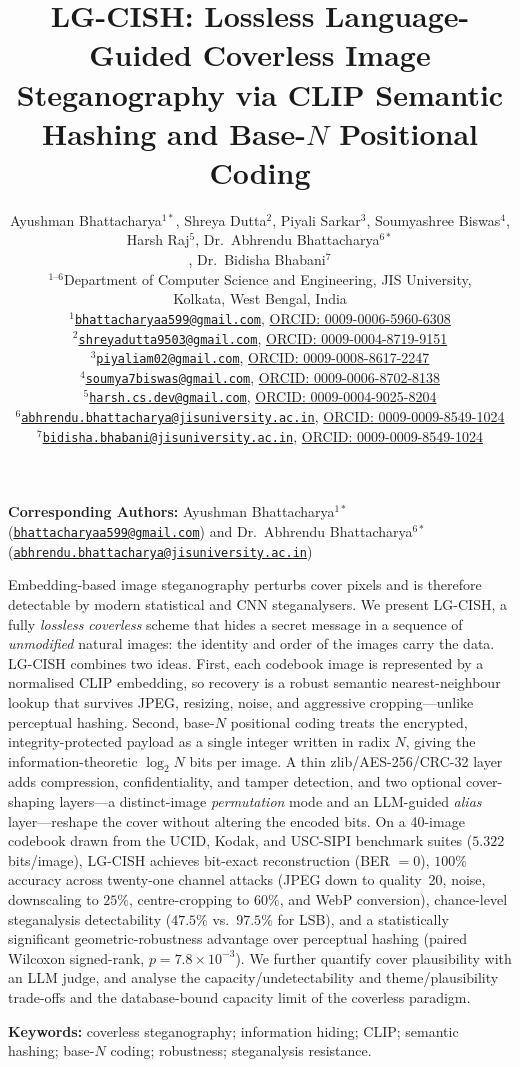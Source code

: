 \documentclass[11pt]{article}
\title{\textbf{LG-CISH: Lossless Language-Guided Coverless Image\\
Steganography via CLIP Semantic Hashing and Base-$N$ Positional Coding}}
\author{%
\begin{minipage}{0.95\textwidth}
\centering
Ayushman Bhattacharya$^{1*}$, Shreya Dutta$^{2}$,
Piyali Sarkar$^{3}$, Soumyashree Biswas$^{4}$,\\
Harsh Raj$^{5}$, Dr.\ Abhrendu Bhattacharya$^{6*}$\\[0.5em], Dr.\  Bidisha Bhabani$^{7}$\\[0.5em]
{\small $^{1\text{--}6}$Department of Computer Science and Engineering, JIS University,\\
Kolkata, West Bengal, India}\\[0.5em]
{\scriptsize
$^{1}$\href{mailto:bhattacharyaa599@gmail.com}{\texttt{bhattacharyaa599@gmail.com}},
\href{https://orcid.org/0009-0006-5960-6308}{ORCID: 0009-0006-5960-6308}\\
$^{2}$\href{mailto:shreyadutta9503@gmail.com}{\texttt{shreyadutta9503@gmail.com}},
\href{https://orcid.org/0009-0004-8719-9151}{ORCID: 0009-0004-8719-9151}\\
$^{3}$\href{mailto:piyaliam02@gmail.com}{\texttt{piyaliam02@gmail.com}},
\href{https://orcid.org/0009-0008-8617-2247}{ORCID: 0009-0008-8617-2247}\\
$^{4}$\href{mailto:soumya7biswas@gmail.com}{\texttt{soumya7biswas@gmail.com}},
\href{https://orcid.org/0009-0006-8702-8138}{ORCID: 0009-0006-8702-8138}\\
$^{5}$\href{mailto:harsh.cs.dev@gmail.com}{\texttt{harsh.cs.dev@gmail.com}},
\href{https://orcid.org/0009-0004-9025-8204}{ORCID: 0009-0004-9025-8204}\\
$^{6}$\href{mailto:abhrendu.bhattacharya@jisuniversity.ac.in}{\texttt{abhrendu.bhattacharya@jisuniversity.ac.in}},
\href{https://orcid.org/0009-0009-8549-1024}{ORCID: 0009-0009-8549-1024}\\
$^{7}$\href{mailto:bidisha.bhabani@jisuniversity.ac.in}{\texttt{bidisha.bhabani@jisuniversity.ac.in}},
\href{https://orcid.org/0009-0000-5743-6882}{ORCID: 0009-0009-8549-1024}}
\end{minipage}}
\date{}
\renewenvironment{abstract}{%
  \par\noindent\textbf{\abstractname}\par\medskip\justifying
}{\par\medskip}
\theoremstyle{definition}
\begin{document}
\maketitle

\begin{center}
{\small
\textbf{Corresponding Authors:}
Ayushman Bhattacharya$^{1*}$
(\href{mailto@gmail.com}{\texttt{bhattacharyaa599@gmail.com}})
and Dr.\ Abhrendu Bhattacharya$^{6*}$
(\href{mailto.bhattacharya@jisuniversity.ac.in}
{\texttt{abhrendu.bhattacharya@jisuniversity.ac.in}})
}
\end{center}

\begin{abstract}
\noindent
Embedding-based image steganography perturbs cover pixels and is therefore
detectable by modern statistical and CNN steganalysers. We present LG-CISH,
a fully \emph{lossless} \emph{coverless} scheme that hides a secret message in a
sequence of \emph{unmodified} natural images: the identity and order of the images
carry the data. LG-CISH combines two ideas. First, each codebook image is
represented by a normalised CLIP embedding, so recovery is a robust semantic
nearest-neighbour lookup that survives JPEG, resizing, noise, and aggressive
cropping---unlike perceptual hashing. Second, base-$N$ positional coding treats
the encrypted, integrity-protected payload as a single integer written in radix
$N$, giving the information-theoretic $\log_2 N$ bits per image. A thin
zlib/AES-256/CRC-32 layer adds compression, confidentiality, and tamper
detection, and two optional cover-shaping layers---a distinct-image
\emph{permutation} mode and an LLM-guided \emph{alias} layer---reshape the cover
without altering the encoded bits. On a 40-image codebook drawn from the UCID,
Kodak, and USC-SIPI benchmark suites ($5.322$ bits/image), LG-CISH achieves
bit-exact reconstruction (BER $=0$), $100\%$ accuracy across twenty-one channel
attacks (JPEG down to quality~20, noise, downscaling to $25\%$, centre-cropping to
$60\%$, and WebP conversion), chance-level steganalysis detectability ($47.5\%$
vs.\ $97.5\%$ for LSB), and a statistically significant geometric-robustness
advantage over perceptual hashing (paired Wilcoxon signed-rank,
$p=7.8\times10^{-3}$). We further quantify cover plausibility with an LLM judge,
and analyse the capacity/undetectability and theme/plausibility trade-offs and the
database-bound capacity limit of the coverless paradigm.
\end{abstract}

\noindent\textbf{Keywords:} coverless steganography; information hiding; CLIP;
semantic hashing; base-$N$ coding; robustness; steganalysis resistance.
\end{document}
